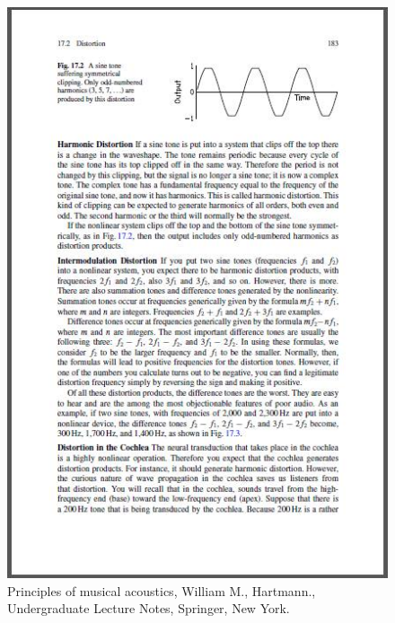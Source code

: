 \begin{figure}[!htb]
	\centering
	\includegraphics[scale=0.8]{distorsion2.jpg}
	\caption{Principles of musical acoustics, William M., Hartmann., Undergraduate Lecture Notes, Springer, New York.}
\end{figure}

\clearpage


\nocite{*}

